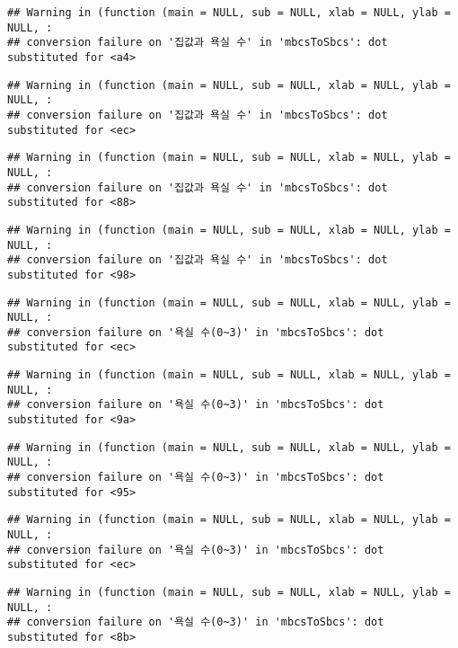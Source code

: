 \documentclass[
]{article}
\begin{document}
\begin{verbatim}
## Warning in (function (main = NULL, sub = NULL, xlab = NULL, ylab = NULL, :
## conversion failure on '집값과 욕실 수' in 'mbcsToSbcs': dot substituted for <a4>
\end{verbatim}

\begin{verbatim}
## Warning in (function (main = NULL, sub = NULL, xlab = NULL, ylab = NULL, :
## conversion failure on '집값과 욕실 수' in 'mbcsToSbcs': dot substituted for <ec>
\end{verbatim}

\begin{verbatim}
## Warning in (function (main = NULL, sub = NULL, xlab = NULL, ylab = NULL, :
## conversion failure on '집값과 욕실 수' in 'mbcsToSbcs': dot substituted for <88>
\end{verbatim}

\begin{verbatim}
## Warning in (function (main = NULL, sub = NULL, xlab = NULL, ylab = NULL, :
## conversion failure on '집값과 욕실 수' in 'mbcsToSbcs': dot substituted for <98>
\end{verbatim}

\begin{verbatim}
## Warning in (function (main = NULL, sub = NULL, xlab = NULL, ylab = NULL, :
## conversion failure on '욕실 수(0~3)' in 'mbcsToSbcs': dot substituted for <ec>
\end{verbatim}

\begin{verbatim}
## Warning in (function (main = NULL, sub = NULL, xlab = NULL, ylab = NULL, :
## conversion failure on '욕실 수(0~3)' in 'mbcsToSbcs': dot substituted for <9a>
\end{verbatim}

\begin{verbatim}
## Warning in (function (main = NULL, sub = NULL, xlab = NULL, ylab = NULL, :
## conversion failure on '욕실 수(0~3)' in 'mbcsToSbcs': dot substituted for <95>
\end{verbatim}

\begin{verbatim}
## Warning in (function (main = NULL, sub = NULL, xlab = NULL, ylab = NULL, :
## conversion failure on '욕실 수(0~3)' in 'mbcsToSbcs': dot substituted for <ec>
\end{verbatim}

\begin{verbatim}
## Warning in (function (main = NULL, sub = NULL, xlab = NULL, ylab = NULL, :
## conversion failure on '욕실 수(0~3)' in 'mbcsToSbcs': dot substituted for <8b>
\end{verbatim}
\end{document}
